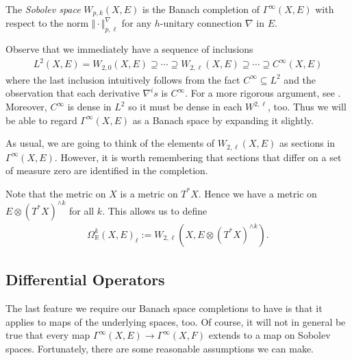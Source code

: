\documentclass[12pt]{ociamthesis}  %
\begin{document}
\begin{definition}
  The \emph{Sobolev space} $W_{p,k}(X,E)$ is the Banach completion of
  $\Gamma^\infty(X,E)$ with respect to the norm
  $\Vert\cdot\Vert_{p,\ell}^\nabla$ for any $h$-unitary connection
  $\nabla$ in $E$.
\end{definition}

Observe that we immediately have a sequence of inclusions
\begin{align*}
  L^2(X,E) =
  W_{2,0}(X,E) \supseteq
  \cdots \supseteq
  W_{2,\ell}(X,E) \supseteq
  \cdots
  \supseteq
  C^\infty(X,E)
\end{align*}
where the last inclusion intuitively follows from the fact
$C^\infty \subseteq L^2$ and the observation that each derivative
$\nabla^i s$ is $C^\infty$. For a more rigorous argument, see
\cite[Corollary 3.8.3]{bc2009}.
Moreover, $C^\infty$ is dense in $L^2$ so it must be dense in each
$W^{2,\ell}$, too. Thus we will be able to regard $\Gamma^\infty(X,E)$
as a Banach space by expanding it slightly.

As usual, we are going to think of the elements of $W_{2,\ell}(X,E)$ as
sections in $\Gamma^\infty(X,E)$. However, it is worth remembering that
sections that differ on a set of measure zero are identified in the
completion.

\begin{example}
  Note that the metric on $X$ is a metric on $T^*X$. Hence we have
  a metric on $E\otimes (T^*X)^{\wedge k}$ for all $k$. This allows
  us to define
  \begin{align*}
    \Omega_{\mathbb{R}}^k(X,E)_\ell := W_{2,\ell}(X,E\otimes(T^*X)^{\wedge k}).
  \end{align*}
\end{example}

\subsection{Differential Operators}

The last feature we require our Banach space completions to have is
that it applies to maps of the underlying spaces, too. Of course,
it will not in general be true that every map
$\Gamma^\infty(X,E)\to\Gamma^\infty(X,F)$ extends to a map on
Sobolev spaces. Fortunately, there are some reasonable assumptions
we can make.
\end{document}
